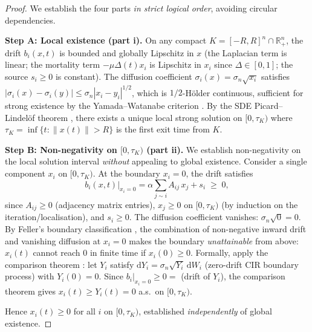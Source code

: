 \begin{proof}
We establish the four parts \emph{in strict logical order}, avoiding circular
dependencies.

\medskip
\noindent\textbf{Step A: Local existence (part i).}
On any compact $K=[-R,R]^n\cap\mathbb{R}^n_+$, the drift $b_i(x,t)$ is bounded
and globally Lipschitz in $x$ (the Laplacian term is linear; the mortality term
$-\mu\Delta(t)x_i$ is Lipschitz in $x_i$ since $\Delta\in[0,1]$; the source
$s_i\ge 0$ is constant).
The diffusion coefficient $\sigma_i(x)=\sigma_n\sqrt{x_i}$ satisfies
$|\sigma_i(x)-\sigma_i(y)|\le\sigma_n|x_i-y_i|^{1/2}$, which is
$1/2$-H\"older continuous, sufficient for strong existence by the
Yamada--Watanabe criterion \cite{YamadaWatanabe1971}.
By the SDE Picard--Lindel\"of theorem \cite[Thm.~5.2.1]{Oksendal2003},
there exists a unique local strong solution on $[0,\tau_K)$ where
$\tau_K=\inf\{t:\|x(t)\|>R\}$ is the first exit time from $K$.

\medskip
\noindent\textbf{Step B: Non-negativity on $[0,\tau_K)$ (part ii).}
We establish non-negativity on the local solution interval \emph{without}
appealing to global existence.
Consider a single component $x_i$ on $[0,\tau_K)$.
At the boundary $x_i=0$, the drift satisfies
\begin{equation}
  b_i(x,t)\big|_{x_i=0}
  = \alpha\sum_{j\sim i} A_{ij}\,x_j + s_i
  \;\ge\; 0,
  \label{eq:inward_drift}
\end{equation}
since $A_{ij}\ge 0$ (adjacency matrix entries), $x_j\ge 0$ on $[0,\tau_K)$
(by induction on the iteration/localisation), and $s_i\ge 0$.
The diffusion coefficient vanishes: $\sigma_n\sqrt{0}=0$.
By Feller's boundary classification \cite{Feller1951}, the combination of
non-negative inward drift and vanishing diffusion at $x_i=0$ makes the
boundary \emph{unattainable} from above: $x_i(t)$ cannot reach $0$ in finite
time if $x_i(0)\ge 0$.  Formally, apply the comparison theorem
\cite[Thm.~IX.3.7]{RevuzYor1999}: let $Y_i$ satisfy
$\mathrm{d}Y_i=\sigma_n\sqrt{Y_i}\,\mathrm{d}W_i$ (zero-drift CIR boundary process)
with $Y_i(0)=0$.  Since $b_i|_{x_i=0}\ge 0=$ (drift of $Y_i$), the comparison
theorem gives $x_i(t)\ge Y_i(t)=0$ a.s.\ on $[0,\tau_K)$.

Hence $x_i(t)\ge 0$ for all $i$ on $[0,\tau_K)$, established \emph{independently}
of global existence.


\end{proof}
